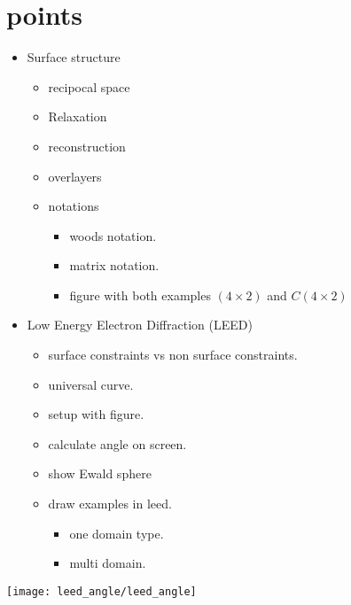 \documentclass[article,a4paper,openleft]{memoir}
\begin{document}
\section{points}
\begin{itemize}
        \item Surface structure
        \begin{itemize}
                \item recipocal space
                \item Relaxation
                \item reconstruction
                \item overlayers
                \item notations
                        \begin{itemize}
                                \item woods notation.
                                \item matrix notation.
                                \item figure with both examples $(4\times2)$ and $C(4\times2)$
                        \end{itemize}
        \end{itemize}
        \item Low Energy Electron Diffraction (LEED)
                \begin{itemize}
                        \item surface constraints vs non surface constraints.
                        \item universal curve.
                        \item setup with figure.
                        \item calculate angle on screen.
                        \item show Ewald sphere
                        \item draw examples in leed.
                                \begin{itemize}
                                        \item one domain type.
                                        \item multi domain.
                                \end{itemize}
                \end{itemize}
\end{itemize}
\texttt{[image: leed\_angle/leed\_angle]}
\end{document}
